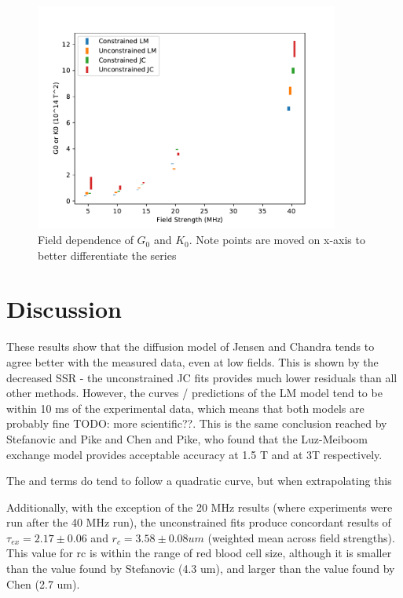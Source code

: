 \begin{figure}[h]
\centering
\includegraphics[width=10cm]{figures/diffmodels/G0K0field.pdf}
\caption[Field dependence of $G_0$ and $K_0$]{Field dependence of $G_0$ and $K_0$. Note points are moved on x-axis to better differentiate the series}
\label{fig:dm-KGfield}
\end{figure}

\section{Discussion}
These results show that the diffusion model of Jensen and Chandra tends to agree better with the measured data, even at low fields.
This is shown by the decreased SSR - the unconstrained JC fits provides much lower residuals than all other methods.
However, the curves / predictions of the LM model tend to be within 10 ms of the experimental data, which means that both models are probably fine TODO: more scientific??.
This is the same conclusion reached by Stefanovic and Pike and Chen and Pike, who found that the Luz-Meiboom exchange model provides acceptable accuracy at 1.5 T and at 3T respectively.

The \Kzero and \Gzero terms do tend to follow a quadratic curve, but when extrapolating this

Additionally, with the exception of the 20 MHz results (where experiments were run after the 40 MHz run), the unconstrained fits produce concordant results of $\tau_{ex} = 2.17 \pm 0.06$ and $r_c = 3.58 \pm 0.08 um$ (weighted mean across field strengths).
This value for rc is within the range of red blood cell size, although it is smaller than the value found by Stefanovic (4.3 um)\cite{StefanovicHumanwholebloodrelaxometry2004}, and larger than the value found by Chen (2.7 um)\cite{ChenHumanwholeblood2009}.

